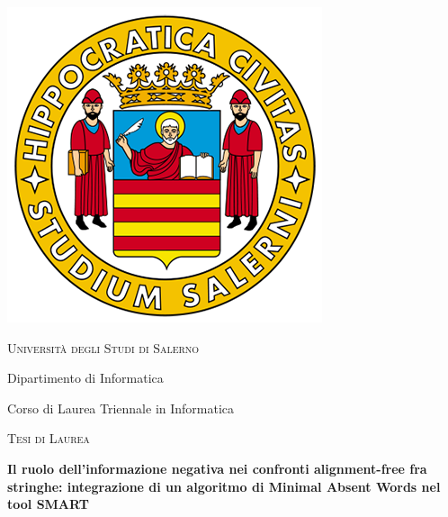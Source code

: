 \documentclass{article}
\begin{document}
    \begin{center}
    
        \includegraphics[scale=0.2]{assets/logo_standard.png}
    
        \vspace{2mm}
    
        \textsc{\huge Università degli Studi di Salerno}
        
        \vspace{5mm}
        
        {\fontsize{20pt}{30} \selectfont Dipartimento di Informatica}
        
        {\fontsize{20pt}{30} \selectfont Corso di Laurea Triennale in Informatica}
        
        \vspace{10mm}
        
        \textsc{\Large Tesi di Laurea}
        
        \vspace{10mm}
        
        \textbf{\fontsize{20pt}{30} \selectfont Il ruolo dell'informazione negativa nei confronti alignment-free fra stringhe: integrazione di un algoritmo di Minimal Absent Words nel tool SMART}
        
    \end{center}
    
        \vspace{10mm}
    
\end{document}
